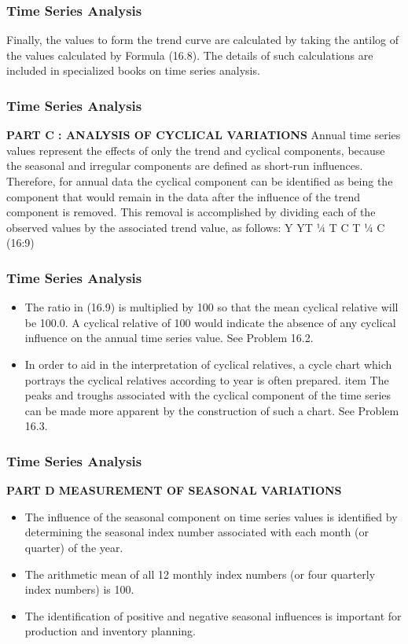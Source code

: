 \documentclass{beamer}
\begin{document}
\begin{frame}
\frametitle{Time Series Analysis}
Finally, the values to form the trend curve are calculated by taking the antilog of the values calculated
by Formula (16.8). The details of such calculations are included in specialized books on time series
analysis.

\end{frame}
\begin{frame}
\frametitle{Time Series Analysis}
\textbf{PART C : ANALYSIS OF CYCLICAL VARIATIONS}
Annual time series values represent the effects of only the trend and cyclical components, because the
seasonal and irregular components are defined as short-run influences. Therefore, for annual data the
cyclical component can be identified as being the component that would remain in the data after the influence of
the trend component is removed. This removal is accomplished by dividing each of the observed values by the
associated trend value, as follows:
Y
YT
¼
T   C
T
¼ C (16:9)
\end{frame}
\begin{frame}
\frametitle{Time Series Analysis}
\begin{itemize}
\item The ratio in (16.9) is multiplied by 100 so that the mean cyclical relative will be 100.0. A cyclical relative
of 100 would indicate the absence of any cyclical influence on the annual time series value. See Problem 16.2.
\item In order to aid in the interpretation of cyclical relatives, a cycle chart which portrays the cyclical relatives
according to year is often prepared. 
item The peaks and troughs associated with the cyclical component of the time
series can be made more apparent by the construction of such a chart. See Problem 16.3.
\end{itemize}
\end{frame}
\begin{frame}
\frametitle{Time Series Analysis}
\textbf{PART D  MEASUREMENT OF SEASONAL VARIATIONS}
\begin{itemize}
\item The influence of the seasonal component on time series values is identified by determining the seasonal
index number associated with each month (or quarter) of the year. 
\item The arithmetic mean of all 12 monthly index
numbers (or four quarterly index numbers) is 100. 
\item The identification of positive and negative seasonal
influences is important for production and inventory planning.
\end{itemize}
\end{frame}
\end{document}
